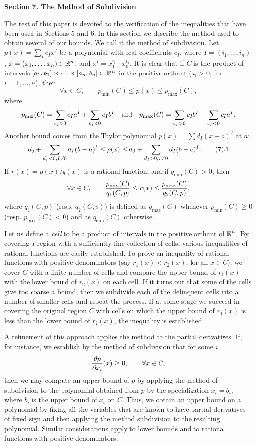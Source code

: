 \bigskip
\centerline{\bf Section 7. The Method of Subdivision}
\bigskip
The rest of this paper is devoted to the verification of the
inequalities that have been used in Sections 5 and 6.
In this section we describe the method used to obtain several of
our bounds.  We call it the method of subdivision.
Let $p(x) = \sum_I c_I x^I$ be a polynomial with real coefficients
$c_I$, where
$I = (i_1,\ldots,i_n)$, $x=(x_1,\ldots,x_n)\in {\Bbb R}^n$, and
$x^I = x_1^{i_1}\cdots x_n^{i_n}$.
It is clear that if $C$ is the product of intervals $[a_1,b_1]\times
\cdots \times [a_n,b_n] \subset {\Bbb R}^n$ in the positive orthant
($a_i>0$, for $i=1,\ldots,n$), then
$$\forall x\in C,\qquad
p_{\min}(C) \le p(x) \le p_{\max}(C),$$
where $$p_{\min}(C) = \sum_{c_I>0} c_I a^I + \sum_{c_I<0} c_I b^I
\quad\hbox{and}\quad
p_{\max}(C) = \sum_{c_I>0} c_I b^I + \sum_{c_I<0} c_I a^I.$$
Another bound comes from the Taylor polynomial $p(x) = \sum d_I
(x-a)^I$ at $a$:
$$d_0 + \sum_{d_I<0,I\ne0}
   d_I(b-a)^I \le p(x) \le d_0 +\sum_{d_I>0,I\ne0}
    d_I(b-a)^I.\tag 7.1$$
If $r(x)=p(x)/q(x)$ is a rational function, and
if $q_{\min}(C)>0$, then
$$\forall x\in C,\qquad
{p_{\min}(C)\over q_1(C,p)} \le r(x) \le {p_{\max}(C)\over q_{2}(C,p)},$$
where
$q_1(C,p)$ (resp. $q_2(C,p)$)
is defined as $q_{\max}(C)$ whenever $p_{\min}(C) \ge 0$ (resp. $p_{\max}(C)<0$)
and as $q_{\min}(C)$ otherwise.

Let us define a {\it cell\/} to be a product of intervals
in the positive orthant of ${\Bbb R}^n$.
By covering a region with a sufficiently fine collection of cells,
 various inequalities of rational functions are easily
established.
To prove an inequality of rational functions with
positive denominators (say $r_1(x) < r_2(x)$, for all $x\in C$), we
cover $C$ with a finite number of cells and compare the upper bound
of $r_1(x)$ with the lower bound of $r_2(x)$ on each cell.  If it turns
out that some of the cells give too coarse a bound, then we
subdivide each of the delinquent cells into a number of smaller
cells and repeat the process.  If at some stage we succeed in
covering the original region $C$ with cells on which the upper bound
of $r_1(x)$ is less than the lower bound of $r_2(x)$, the inequality
is established.

A refinement of this approach applies the method to the partial
derivatives.
  If, for instance, we establish by the method of
subdivision that for some $i$
$${\partial p\over \partial x_i}(x) \ge 0,\qquad \forall x\in C,$$
then we may compute an upper bound of $p$ by applying the method
of subdivision to the polynomial obtained from $p$ by the specialization
$x_i=b_i$, where $b_i$ is the upper bound of $x_i$ on $C$.
Thus, we obtain an upper bound on a polynomial by fixing all the
variables that are known to have partial derivatives
  of fixed sign and then
applying the method subdivision to the resulting polynomial.
Similar considerations apply to lower bounds and to
rational functions with
positive denominators.

